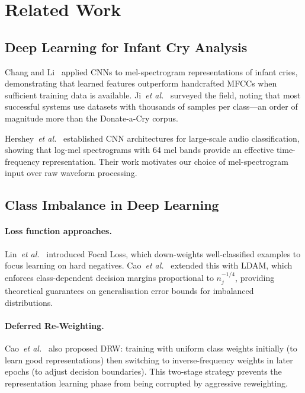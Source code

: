\documentclass[11pt,a4paper]{article}
\begin{document}
\section{Related Work}
\label{sec:related}

\subsection{Deep Learning for Infant Cry Analysis}

Chang and Li~\cite{chang2017infant} applied CNNs to mel-spectrogram
representations of infant cries, demonstrating that learned features
outperform handcrafted MFCCs when sufficient training data is available.
Ji~\textit{et al.}~\cite{ji2021review} surveyed the field, noting that
most successful systems use datasets with thousands of samples per
class---an order of magnitude more than the Donate-a-Cry corpus.

Hershey~\textit{et al.}~\cite{hershey2017cnn} established CNN
architectures for large-scale audio classification, showing that
log-mel spectrograms with 64 mel bands provide an effective
time-frequency representation. Their work motivates our choice of
mel-spectrogram input over raw waveform processing.

\subsection{Class Imbalance in Deep Learning}

\paragraph{Loss function approaches.}
Lin~\textit{et al.}~\cite{lin2017focal} introduced Focal Loss, which
down-weights well-classified examples to focus learning on hard
negatives. Cao~\textit{et al.}~\cite{cao2019ldam} extended this with
LDAM, which enforces class-dependent decision margins proportional to
$n_j^{-1/4}$, providing theoretical guarantees on generalisation error
bounds for imbalanced distributions.

\paragraph{Deferred Re-Weighting.}
Cao~\textit{et al.}~\cite{cao2019ldam} also proposed DRW: training with
uniform class weights initially (to learn good representations) then
switching to inverse-frequency weights in later epochs (to adjust
decision boundaries). This two-stage strategy prevents the representation
learning phase from being corrupted by aggressive reweighting.
\end{document}
